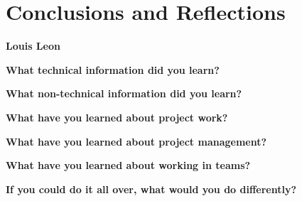 \documentclass[onecolumn, draftclsnofoot,10pt, compsoc]{IEEEtran}
\begin{document}
\section{Conclusions and Reflections}
\begin{flushleft}
{\large\textbf{Louis Leon}\par}
\textbf{What technical information did you learn?}\par

\textbf{What non-technical information did you learn?}\par

\textbf{What have you learned about project work?}\par

\textbf{What have you learned about project management?}\par

\textbf{What have you learned about working in teams?}\par

\textbf{If you could do it all over, what would you do differently?}\par

\end{flushleft}
\end{document}
